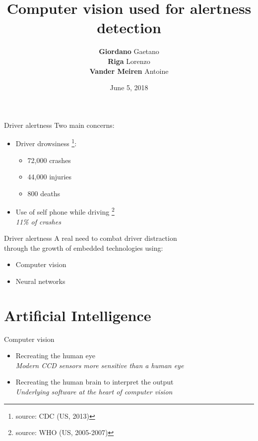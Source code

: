 \documentclass{beamer}
\title{Computer vision used for alertness detection}
\author{\textbf{Giordano} Gaetano \\ \textbf{Riga} Lorenzo \\ \textbf{Vander Meiren} Antoine \\}
\date{June 5, 2018}
\institute{ECAM Brussels}
\begin{document}
\maketitle
\begin{frame}{Driver alertness}
Two main concerns:
	\begin{itemize}
        \item Driver drowsiness \footnote{source: CDC (US, 2013) }:
    \begin{itemize}
        \item 72,000 crashes
        \item 44,000 injuries
        \item 800 deaths
    \end{itemize}
    \item Use of self phone while driving \footnote{source: WHO (US, 2005-2007)} \\
        \hspace{0.27cm} \textit{11\% of crashes}
	\end{itemize}
\end{frame}

\begin{frame}{Driver alertness}
A real need to combat driver distraction \\
through the growth of embedded technologies using:
    \begin{itemize}
    \item Computer vision
    \item Neural networks
    \end{itemize}
\end{frame}

\section{Artificial Intelligence}
\begin{frame}{Computer vision}
	\begin{itemize}
	\item Recreating the human eye \\
        \hspace{0.27cm} \textit{Modern CCD sensors more sensitive than a human eye}
    \item Recreating the human brain to interpret the output \\
        \hspace{0.27cm} \textit{Underlying software at the heart of computer vision}
	\end{itemize}
\end{frame}
\end{document}
